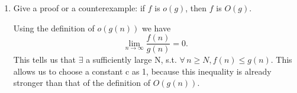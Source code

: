\documentclass[11pt]{article}
\begin{document}
\begin{enumerate}
\item Give a proof or a counterexample:  if $f$ is $o(g)$, then $f$ is $O(g)$.

\begin{adjustwidth}{.5cm}{}
Using the definition of $o(g(n))$ we have $$\lim_{n\to\infty} \frac{f(n)}{g(n)} = 0.$$  This tells us that $\exists$ a sufficiently large N, s.t. $\forall \, n \geq N, f(n) \leq g(n)$.  This allows us to choose a constant c as 1, because this inequality is already stronger than that of the definition of $O(g(n))$.
\end{adjustwidth}

\end{enumerate}
\end{document}
